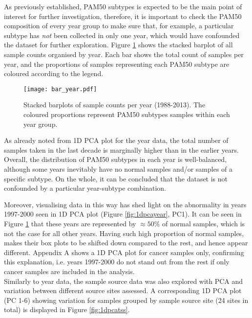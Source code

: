     \newpage
    As previously established, PAM50 subtypes is expected to be the main point of interest for further investigation, therefore, it is important to check the PAM50 composition of every year group to make sure that, for example, a particular subtype has \textit{not} been collected in only one year, which would have confounded the dataset for further exploration. Figure \ref{fig:baryear} shows the stacked barplot of all sample counts organised by year. Each bar shows the total count of samples per year, and the proportions of samples representing each PAM50 subtype are coloured according to the legend. \\
    \newline
    
    
            \begin{figure}[!h]
            \centering
            \texttt{[image: bar\_year.pdf]}
            \caption[Stacked barplots of sample counts per year]{Stacked barplots of sample counts per year (1988-2013). The coloured proportions represent PAM50 subtypes samples within each year group. }
            \label{fig:baryear}
            \end{figure}
    
    As already noted from 1D PCA plot for the year data, the total number of samples taken in the last decade is marginally higher than in the earlier years. Overall, the distribution of PAM50 subtypes in each year is well-balanced,  although some years inevitably have no normal samples and/or samples of a specific subtype. On the whole, it can be concluded that the dataset is not confounded by a particular year-subtype combination.  
    
    Moreover, visualising data in this way has shed light on the abnormality in years 1997-2000 seen in 1D PCA plot (Figure \ref{fig:1dpcayear}, PC1). It can be seen in Figure \ref{fig:baryear} that these years are represented by $\approx50\%$ of normal samples, which is not the case for all other years. Having such high proportion of normal samples, makes their box plots to be shifted down compared to the rest, and hence appear different. Appendix A shows a 1D PCA plot for cancer samples only, confirming this explanation, i.e. years 1997-2000 do not stand out from the rest if only cancer samples are included in the analysis. \\
    
    \newpage
    Similarly to year data, the sample source data was also explored with PCA and variation between different source sites assessed. A corresponding 1D PCA plot (PC 1-6) showing variation for samples grouped by sample source site (24 sites in total) is displayed in Figure \ref{fig:1dpcatss}. \\
    \newline
    

